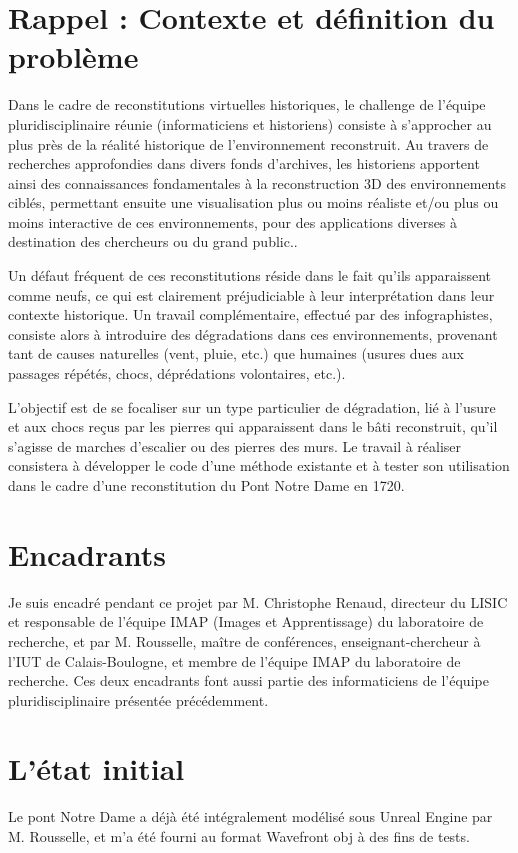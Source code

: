 \documentclass[a4paper,french]{report}
\begin{document}
		\section{Rappel : Contexte et définition du problème}
			Dans le cadre de reconstitutions virtuelles historiques,  le challenge de l'équipe pluridisciplinaire réunie (informaticiens et historiens) consiste à s'approcher au plus près de la réalité historique de l'environnement reconstruit. Au travers de recherches approfondies dans divers fonds d'archives, les historiens apportent ainsi des connaissances fondamentales à la reconstruction 3D des environnements ciblés, permettant ensuite une visualisation plus ou moins réaliste et/ou plus ou moins interactive de ces environnements, pour des applications diverses à destination des chercheurs ou du grand public.. \par
			Un défaut fréquent de ces reconstitutions réside dans le fait qu'ils apparaissent comme neufs, ce qui est clairement préjudiciable à leur interprétation dans leur contexte historique. Un travail complémentaire, effectué par des infographistes, consiste alors à introduire des dégradations dans ces environnements, provenant tant de causes naturelles (vent, pluie, etc.) que humaines (usures dues aux passages répétés, chocs, déprédations volontaires, etc.). \par
			L'objectif est de se focaliser sur un type particulier de dégradation, lié à l'usure et aux chocs reçus par les pierres qui apparaissent dans le bâti reconstruit, qu'il s'agisse de marches d'escalier ou des pierres des murs. Le travail à réaliser consistera à développer le code d'une méthode existante et à tester son utilisation dans le cadre d'une reconstitution du Pont Notre Dame en 1720.
		\section{Encadrants}
			Je suis encadré pendant ce projet par M. Christophe Renaud, directeur du LISIC et responsable de l'équipe IMAP (Images et Apprentissage) du laboratoire de recherche, et par M. Rousselle, maître de conférences, enseignant-chercheur à l'IUT de Calais-Boulogne, et membre de l'équipe IMAP du laboratoire de recherche. Ces deux encadrants font aussi partie des informaticiens de l'équipe pluridisciplinaire présentée précédemment.
		\section{L'état initial}
			Le pont Notre Dame a déjà été intégralement modélisé sous Unreal Engine par M. Rousselle, et m'a été fourni au format Wavefront obj à des fins de tests. 
\end{document}
